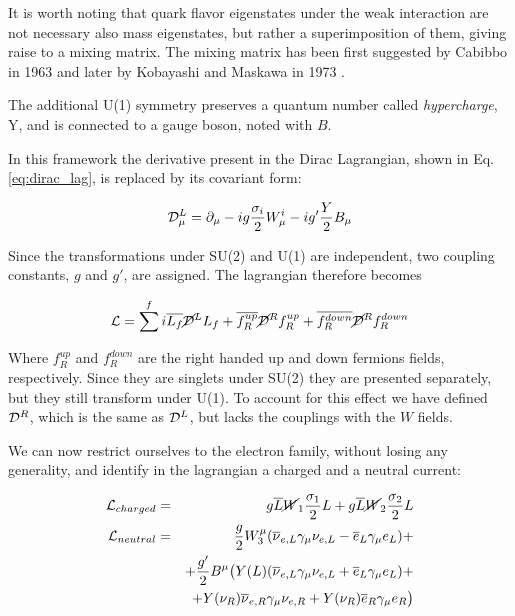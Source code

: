 It is worth noting that quark flavor eigenstates under the weak interaction are not necessary also mass eigenstates, but rather a superimposition of them, giving raise to a mixing matrix. The mixing matrix has been first suggested by Cabibbo in 1963 \cite{Cabibbo:1963yz} and later by Kobayashi and Maskawa in 1973 \cite{Kobayashi:1973fv}.

The additional U(1) symmetry preserves a quantum number called \emph{hypercharge}, Y, and is connected to a gauge boson, noted with $B$. 

In this framework the derivative present in the Dirac Lagrangian, shown in Eq. \ref{eq:dirac_lag}, is replaced by its covariant form:

\begin{equation}
\mathcal{D}^L_\mu = \partial_\mu - ig\dfrac{\sigma_i}{2}W^i_\mu - ig'\dfrac{Y}{2}B_\mu
\end{equation}

Since the transformations under SU(2) and U(1) are independent, two coupling constants, $g$ and $g'$, are assigned. The lagrangian therefore becomes

\begin{equation}
\mathcal{L} = \sum^f i \overline{L_f}\cancel{\mathcal{D}}^LL_f + \overline{f^{up}_R}\cancel{\mathcal{D}}^Rf^{up}_R  + \overline{f^{down}_R}\cancel{\mathcal{D}}^Rf^{down}_R 
\end{equation}

Where $f^{up}_R$ and $f^{down}_R$ are the right handed up and down fermions fields, respectively. Since they are singlets under SU(2) they are presented separately, but they still transform under U(1). To account for this effect we have defined $\mathcal{D}^R$, which is the same as $\mathcal{D}^L$, but lacks the couplings with the $W$ fields. 

We can now restrict ourselves to the electron family, without losing any generality, and identify in the lagrangian a charged and a neutral current:

\begin{eqnarray}
\mathcal{L}_{charged} &=& g \overline{L} \cancel{W}_1 \dfrac{\sigma_1}{2}L + g \overline{L} \cancel{W}_2 \dfrac{\sigma_2}{2}L \\ 
\mathcal{L}_{neutral} &=& \dfrac{g}{2} W_3^\mu (\overline{\nu}_{e,L}\gamma_\mu\nu_{e,L} - \overline{e}_L\gamma_\mu e_L) +  \nonumber \\
& & + \dfrac{g'}{2} B^\mu \mathbf{\big(} Y(L) ( \overline{\nu}_{e,L}\gamma_\mu\nu_{e,L} + \overline{e}_L\gamma_\mu e_L ) + \nonumber \\
& & + Y(\nu_R) \overline{\nu}_{e,R}\gamma_\mu\nu_{e,R} + Y(\nu_R)  \overline{e}_R\gamma_\mu e_R \mathbf{\big)}
\end{eqnarray}

